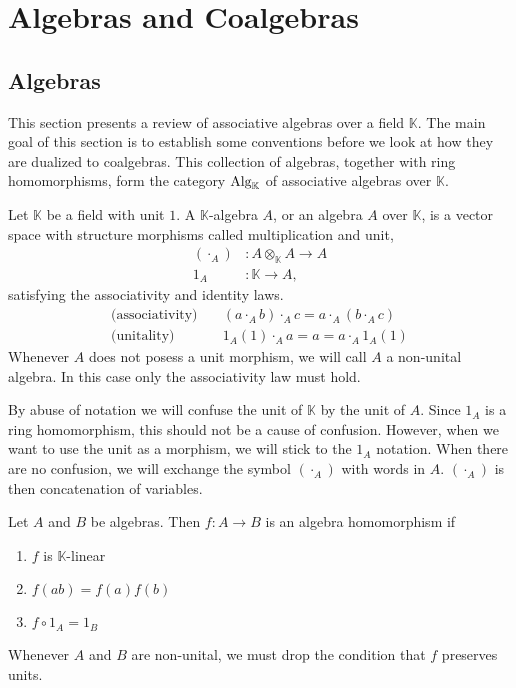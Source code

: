 \documentclass[../thesis.tex]{subfiles}
\begin{document}
    \section{Algebras and Coalgebras}    
    \subsection{Algebras}

            This section presents a review of associative algebras over a field $\mathbb{K}$. The main goal of this section is to establish some conventions before we look at how they are dualized to coalgebras. This collection of algebras, together with ring homomorphisms, form the category $\tt{Alg}_{\mathbb{K}}$ of associative algebras over $\mathbb{K}$.

            \begin{definition}
                Let $\mathbb{K}$ be a field with unit $1$. A $\mathbb{K}$-algebra $A$, or an algebra $A$ over $\mathbb{K}$, is a vector space with structure morphisms called multiplication and unit,
                \begin{align*}
                    (\cdot_A) & : A\otimes_{\mathbb{K}}A \rightarrow A \\
                    1_A & : \mathbb{K} \rightarrow A,
                \end{align*}
                satisfying the associativity and identity laws. 
                \begin{align*}
                    \text{(associativity)}\quad & (a \cdot_A b) \cdot_A c = a \cdot_A (b \cdot_A c) \\
                    \text{(unitality)}\quad & 1_A(1) \cdot_A a = a = a \cdot_A 1_A(1)
                \end{align*}
                Whenever $A$ does not posess a unit morphism, we will call $A$ a non-unital algebra. In this case only the associativity law must hold.
            \end{definition}

            By abuse of notation we will confuse the unit of $\mathbb{K}$ by the unit of $A$. Since $1_A$ is a ring homomorphism, this should not be a cause of confusion. However, when we want to use the unit as a morphism, we will stick to the $1_A$ notation. When there are no confusion, we will exchange the symbol $(\cdot_A)$ with words in $A$. $(\cdot_A)$ is then concatenation of variables. 

            \begin{definition}
                Let $A$ and $B$ be algebras. Then $f: A\rightarrow B$ is an algebra homomorphism if
                \begin{enumerate}
                    \item $f$ is $\mathbb{K}$-linear
                    \item $f(ab)=f(a)f(b)$
                    \item $f\circ 1_A = 1_B$
                \end{enumerate}
                Whenever $A$ and $B$ are non-unital, we must drop the condition that $f$ preserves units.
            \end{definition}
\end{document}
